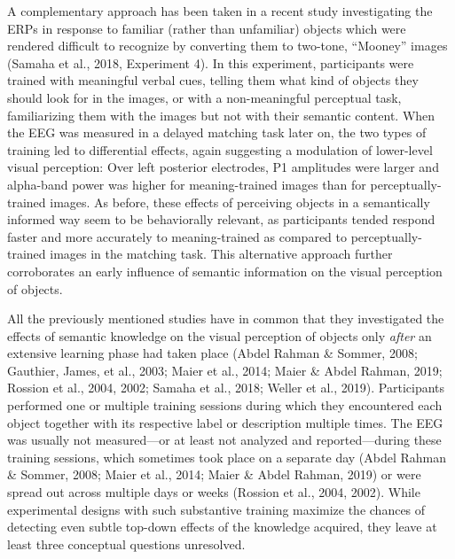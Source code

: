 \documentclass[
  english,
  man,floatsintext]{apa7}
\begin{document}
A complementary approach has been taken in a recent study investigating the ERPs in response to familiar (rather than unfamiliar) objects which were rendered difficult to recognize by converting them to two-tone, ``Mooney'' images (Samaha et al., 2018, Experiment 4). In this experiment, participants were trained with meaningful verbal cues, telling them what kind of objects they should look for in the images, or with a non-meaningful perceptual task, familiarizing them with the images but not with their semantic content. When the EEG was measured in a delayed matching task later on, the two types of training led to differential effects, again suggesting a modulation of lower-level visual perception: Over left posterior electrodes, P1 amplitudes were larger and alpha-band power was higher for meaning-trained images than for perceptually-trained images. As before, these effects of perceiving objects in a semantically informed way seem to be behaviorally relevant, as participants tended respond faster and more accurately to meaning-trained as compared to perceptually-trained images in the matching task. This alternative approach further corroborates an early influence of semantic information on the visual perception of objects.

All the previously mentioned studies have in common that they investigated the effects of semantic knowledge on the visual perception of objects only \emph{after} an extensive learning phase had taken place (Abdel Rahman \& Sommer, 2008; Gauthier, James, et al., 2003; Maier et al., 2014; Maier \& Abdel Rahman, 2019; Rossion et al., 2004, 2002; Samaha et al., 2018; Weller et al., 2019). Participants performed one or multiple training sessions during which they encountered each object together with its respective label or description multiple times. The EEG was usually not measured---or at least not analyzed and reported---during these training sessions, which sometimes took place on a separate day (Abdel Rahman \& Sommer, 2008; Maier et al., 2014; Maier \& Abdel Rahman, 2019) or were spread out across multiple days or weeks (Rossion et al., 2004, 2002). While experimental designs with such substantive training maximize the chances of detecting even subtle top-down effects of the knowledge acquired, they leave at least three conceptual questions unresolved.
\end{document}
